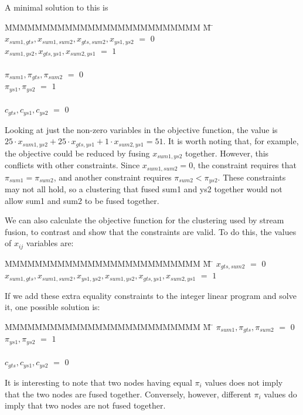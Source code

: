 A minimal solution to this is
\begin{tabbing}
MMMMMMMMMMMMMMMMMMMMMMMMMM \= M \= \kill
$x_{sum1, gts}, x_{sum1, sum2}, x_{gts, sum2}, x_{ys1,  ys2}$
    \> $=$ \> $0$ \\
$x_{sum1, ys2}, x_{gts, ys1 }, x_{sum2, ys1}$
    \> $=$ \> $1$ \\
\\
$\pi_{sum1}, \pi_{gts }, \pi_{sum2}$
    \> $=$ \> $0$ \\
$\pi_{ys1 }, \pi_{ys2 }$
    \> $=$ \> $1$ \\
\\
$c_{gts}, c_{ys1}, c_{ys2}$           
    \> $=$ \> $0$ \\
\end{tabbing}
Looking at just the non-zero variables in the objective function, the value is
$25 \cdot x_{sum1,ys2} + 25 \cdot x_{gts,ys1} + 1 \cdot x_{sum2, ys1} = 51$.
It is worth noting that, for example, the objective could be reduced by fusing $x_{sum1,ys2}$ together.
However, this conflicts with other constraints. Since $x_{sum1, sum2} = 0$, the constraint requires that $\pi_{sum1} = \pi_{sum2}$, and another constraint requires $\pi_{sum2} < \pi_{ys2}$.
These constraints may not all hold, so a clustering that fused sum1 and ys2 together would not allow sum1 and sum2 to be fused together.

We can also calculate the objective function for the clustering used by stream fusion, to contrast and show that the constraints are valid.
To do this, the values of $x_{ij}$ variables are:
\begin{tabbing}
MMMMMMMMMMMMMMMMMMMMMMMMMM \= M \= \kill
$x_{gts, sum2}$
    \> $=$ \> $0$ \\
$x_{sum1, gts}, x_{sum1, sum2}, x_{ys1,  ys2}, x_{sum1, ys2}, x_{gts, ys1 }, x_{sum2, ys1}$
    \> $=$ \> $1$ \\
\end{tabbing}
If we add these extra equality constraints to the integer linear program and solve it, one possible solution is:
\begin{tabbing}
MMMMMMMMMMMMMMMMMMMMMMMMMM \= M \= \kill
$\pi_{sum1}, \pi_{gts }, \pi_{sum2}$
    \> $=$ \> $0$ \\
$\pi_{ys1 }, \pi_{ys2 }$
    \> $=$ \> $1$ \\
\\
$c_{gts}, c_{ys1}, c_{ys2}$           
    \> $=$ \> $0$ \\
\end{tabbing}
It is interesting to note that two nodes having equal $\pi_i$ values does not imply that the two nodes are fused together.
Conversely, however, different $\pi_i$ values do imply that two nodes are not fused together.

